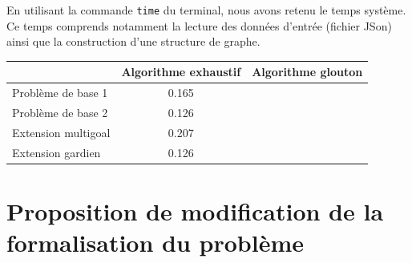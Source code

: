 \documentclass[12pt]{article}
\begin{document}
En utilisant la commande \texttt{time} du terminal, nous avons retenu le temps système. Ce temps comprends notamment la lecture des données d'entrée (fichier JSon) ainsi que la construction d'une structure de graphe.

\begin{tabular}{|l|c|c|}
  \hline
  & Algorithme exhaustif & Algorithme glouton \\
  \hline
  Problème de base 1 & 0.165 & \\
  \hline
  Problème de base 2 & 0.126 & \\
  \hline
  Extension multigoal & 0.207 & \\
  \hline
  Extension gardien & 0.126 & \\
  \hline
\end{tabular}

\section{Proposition de modification de la formalisation du problème}
\end{document}
